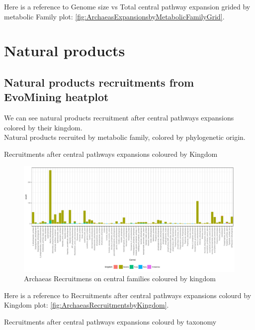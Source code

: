 \documentclass[12pt,twoside]{reedthesis}
\begin{document}
  Here is a reference to Genome size vs Total central pathway expansion
  grided by metabolic Family plot:
  \autoref{fig:ArchaeasExpansionsbyMetabolicFamilyGrid}. \clearpage 
  
  \section{Natural products}\label{natural-products}
  
  \subsection{Natural products recruitments from EvoMining
  heatplot}\label{natural-products-recruitments-from-evomining-heatplot}
  
  We can see natural products recruitment after central pathways
  expansions colored by their kingdom.\\
  Natural products recruited by metabolic family, colored by phylogenetic
  origin.
  
  Recruitments after central pathways expansions coloured by Kingdom
  
  \begin{figure}[h!tbp]
  \centering
  \includegraphics[angle = 0,scale = 0.6]{chapter2/Archaeas/ArchaeasRecruitmentsbyKingdom.pdf}
  \caption[Archaeas Recruitmens on central families coloured by kingdom]{\normalsize{Archaeas Recruitmens on central families coloured by kingdom}}
  \label{fig:ArchaeasRecruitmentsbyKingdom}
  \end{figure}
  
  Here is a reference to Recruitments after central pathways expansions
  colourd by Kingdom plot: \autoref{fig:ArchaeasRecruitmentsbyKingdom}.
  
  \clearpage  Recruitments after central pathways expansions colourd by
  taxonomy
  
\end{document}
